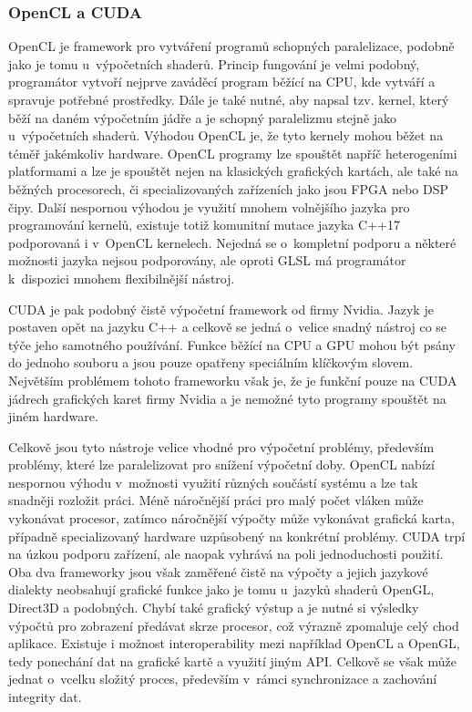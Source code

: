 \subsubsection{OpenCL a CUDA}
OpenCL je framework pro vytváření programů schopných paralelizace, podobně jako je tomu u~výpočetních shaderů. Princip fungování je velmi podobný, programátor vytvoří nejprve zaváděcí program běžící na CPU, kde vytváří a spravuje potřebné prostředky. Dále je také nutné, aby napsal tzv. kernel, který běží na daném výpočetním jádře a je schopný paralelizmu stejně jako u~výpočetních shaderů. Výhodou OpenCL je, že tyto kernely mohou běžet na téměř jakémkoliv hardware. OpenCL programy lze spouštět napříč heterogeními platformami a lze je spouštět nejen na klasických grafických kartách, ale také na běžných procesorech, či specializovaných zařízeních jako jsou FPGA nebo DSP čipy. Další nespornou výhodou je využití mnohem volnějšího jazyka pro programování kernelů, existuje totiž komunitní mutace jazyka C++17 podporovaná i v~OpenCL kernelech. Nejedná se o~kompletní podporu a některé možnosti jazyka nejsou podporovány, ale oproti GLSL má programátor k~dispozici mnohem flexibilnější nástroj. \cite{opencl}

CUDA je pak podobný čistě výpočetní framework od firmy Nvidia. Jazyk je postaven opět na jazyku C++ a celkově se jedná o~velice snadný nástroj co se týče jeho samotného používání. Funkce běžící na CPU a GPU mohou být psány do jednoho souboru a jsou pouze opatřeny speciálním klíčkovým slovem. Největším problémem tohoto frameworku však je, že je funkční pouze na CUDA jádrech grafických karet firmy Nvidia a je nemožné tyto programy spouštět na jiném hardware. \cite{nvidia_developer_2021} \cite{ebersole_2018}

Celkově jsou tyto nástroje velice vhodné pro výpočetní problémy, především problémy, které lze paralelizovat pro snížení výpočetní doby. OpenCL nabízí nespornou výhodu v~možnosti využití různých součástí systému a lze tak snadněji rozložit práci. Méně náročnější práci pro malý počet vláken může vykonávat procesor, zatímco náročnější výpočty může vykonávat grafická karta, případně specializovaný hardware uzpůsobený na konkrétní problémy. CUDA trpí na úzkou podporu zařízení, ale naopak vyhrává na poli jednoduchosti použití. Oba dva frameworky jsou však zaměřené čistě na výpočty a jejich jazykové dialekty neobsahují grafické funkce jako je tomu u~jazyků shaderů OpenGL, Direct3D a podobných. Chybí také grafický výstup a je nutné si výsledky výpočtů pro zobrazení předávat skrze procesor, což výrazně zpomaluje celý chod aplikace. Existuje i možnost interoperability mezi například OpenCL a OpenGL, tedy ponechání dat na grafické kartě a využití jiným API. Celkově se však může jednat o~vcelku složitý proces, především v~rámci synchronizace a zachování integrity dat.

